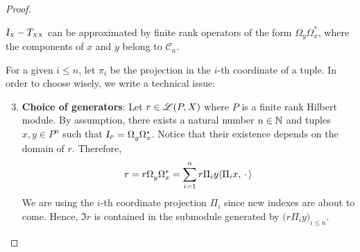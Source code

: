 \begin{lema}
\begin{proof}
\begin{itroman}
    \item \label{item: aproximacao de Id-T_XX} $\sub{\Id}{X}-\sub{T}{X X}$ can be approximated by finite rank operators of the form $\Omega_{y} \Omega_{x}^{*}$, where the components of $x$ and $y$ belong to ${\mathscr C}_n$.
\end{itroman}
For a given $i \leqslant n$, let $\pi_i$ be the projection in the $i$-th coordinate of a tuple. In order to choose wisely, we write a technical issue:
\begin{enumerate}[label=\ensuremath{(\roman*)}]
    \setcounter{enumi}{2}
    \item \textbf{Choice of generators}: Let $r\in \mathscr L(P,X)$ where $P$ is a finite rank Hilbert module. By assumption, there exists a natural number $n \in \operatorname{\mathbb{N}}$ and tuples $x, y \in P^{n}$ such that $\sub\Id{P} = \Omega^{\vphantom{*}}_{y} \Omega_{x}^*$. Notice that their existence depends on the domain of $r$. Therefore,
\[
r = r\Omega^{\vphantom{*}}_{y} \Omega_{x}^* = \sum_{i=1}^{n} r\Pi_iy\langle {\Pi_ix},{\operatorname{\,\cdot\,}}\rangle
\]
    We are using the $i$-th coordinate projection $\Pi_i$ since new indexes are about to come. Hence, $\Im r$ is contained in the submodule generated by $\big(r\Pi_iy\big)_{i \leq n}$.
\end{enumerate}


\end{proof}
\end{lema}
